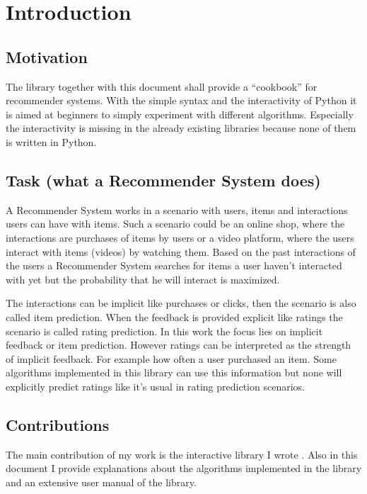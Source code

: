 \chapter{Introduction}


\section{Motivation}

The library together with this document shall provide a ``cookbook''
for recommender systems. With the simple syntax and the interactivity
of Python it is aimed at beginners to simply experiment with different
algorithms. Especially the interactivity is missing in the already
existing libraries because none of them is written in Python.


\section{Task (what a Recommender System does)}

A Recommender System works in a scenario with users, items and interactions
users can have with items. Such a scenario could be an online shop,
where the interactions are purchases of items by users or a video
platform, where the users interact with items (videos) by watching
them. Based on the past interactions of the users a Recommender System
searches for items a user haven't interacted with yet but the probability
that he will interact is maximized.

The interactions can be implicit like purchases or clicks, then the
scenario is also called item prediction. When the feedback is provided
explicit like ratings the scenario is called rating prediction. In
this work the focus lies on implicit feedback or item prediction.
However ratings can be interpreted as the strength of implicit feedback.
For example how often a user purchased an item. Some algorithms implemented
in this library can use this information but none will explicitly
predict ratings like it's usual in rating prediction scenarios.


\section{Contributions}

The main contribution of my work is the interactive library I wrote
\cite{recsyslab}. Also in this document I provide explanations about
the algorithms implemented in the library and an extensive user manual
of the library.

